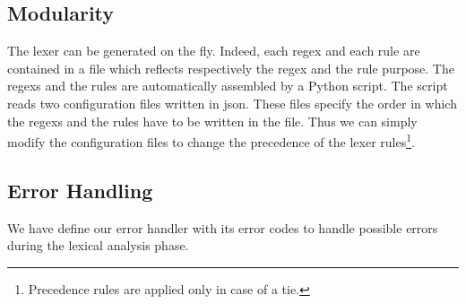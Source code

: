 \subsection{Modularity}
The lexer can be generated on the fly. Indeed, each regex and each rule are
contained in a file which reflects respectively the regex and the rule purpose.
The regexs and the rules are automatically assembled by a Python script.
The script reads two configuration files written in json. These files specify
the order in which the regexs and the rules have to be written in the
 file. Thus we can simply modify the configuration files to 
change the precedence of the lexer rules\footnote{Precedence rules are 
applied only in case of a tie.}.

\subsection{Error Handling}
We have define our error handler with its error codes to handle possible errors
during the lexical analysis phase.
